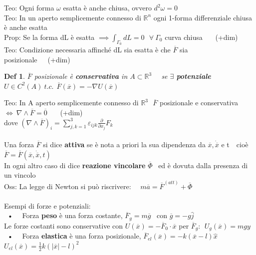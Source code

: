 \documentclass{article}
\theoremstyle{unnumbered}
\newtheorem* {theoremT}{Def}
\theoremstyle{unnumbered1}
\newenvironment{defi}{\begin{gBox}\begin{theoremT}}{\end{theoremT}\end{gBox}}
\begin{document}
%
%
%
Teo: Ogni forma $\omega$ esatta è anche chiusa, ovvero $d^2\omega = 0$\\
Teo: In un aperto semplicemente connesso di $\mathbb{R}^n$ ogni 1-forma differenziale chiusa è anche esatta\\ 
%
Prop: Se la forma dL è esatta $\implies \int_{\Gamma_0} dL = 0 \ \ \ \forall \ \Gamma_0$ curva chiusa \ \ \ (+dim)\\ 
%
Teo: Condizione necessaria affinché dL sia esatta è che $\overline{F}$ sia posizionale\ \ \ (+dim)\\
%
%
%
\begin{defi}
$\overline{F}$ posizionale è \textbf{conservativa} in $A\subset\mathbb{R}^3$ \ \ se $\exists$ \textbf{potenziale} $U\in C^2(A) \ t.c. \ \ \overline{F}(\overline{x})=-\nabla U(\overline{x})$
\end{defi}
%
Teo: In A aperto semplicemente connesso di $\mathbb{R}^3 \ \ \ \overline{F}$ posizionale e conservativa $\Leftrightarrow \ \nabla \wedge \overline{F} = \overline{0}$ \ \ \ (+dim)\\
\phantom{} \hspace{0.23in} dove $(\nabla\wedge\overline{F})_i = \sum^3_{j,k=1} \varepsilon_{ijk} \frac{\partial}{\partial x_j}F_k$ \\ \\
%
%
%
Una forza $\overline{F}$ si dice \textbf{attiva} se è nota a priori la sua dipendenza da $\overline{x}, \dot{\overline{x}}$ e t\ \ cioè $\overline{F}=\overline{F}(\overline{x},\dot{\overline{x}},t)$ \\
In ogni altro caso di dice \textbf{reazione vincolare} $\overline{\Phi}$ \ ed è dovuta dalla presenza di un vincolo\\
%
Oss: La legge di Newton si può riscrivere: \ \ $m\overline{a} = \overline{F}^{(att)} + \overline{\Phi}$ \\ \\
%
% 
%
Esempi di forze e potenziali:\\
\ • \ \ Forza \textbf{peso} è una forza costante, $\overline{F}_g=m\overline{g}$ \ con $\overline{g}=-g\hat{j}$\\
\phantom{} \hspace{0.18in} Le forze costanti sono conservative con $U(\overline{x})=-\overline{F}_0\cdot\overline{x}$ \hspace{0.18in} per $\overline{F}_g: \ \ U_g(\overline{x})= mgy$\\
%
\ • \ \ Forza \textbf{elastica} è una forza posizionale, $\overline{F}_{el}(\overline{x})=-k(\overline{x}-l)\hat{x}$ \hspace{0.18in} $U_{el}(\overline{x})=\frac{1}{2}k(|\overline{x}|-l)^2$\\
\end{document}
